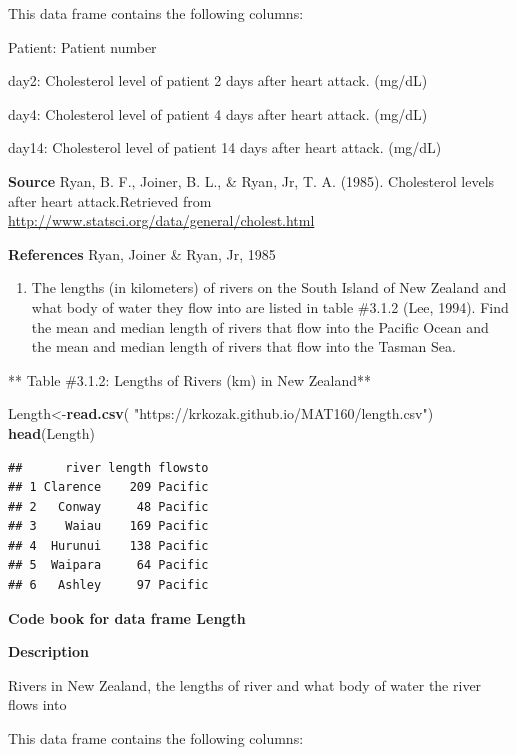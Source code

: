 \documentclass[
]{book}
\newenvironment{Shaded}{\begin{snugshade}}{\end{snugshade}}
\newcommand{\KeywordTok}[1]{\textcolor[rgb]{0.13,0.29,0.53}{\textbf{#1}}}
\newcommand{\NormalTok}[1]{#1}
\newcommand{\StringTok}[1]{\textcolor[rgb]{0.31,0.60,0.02}{#1}}
\providecommand{\tightlist}{%
  \setlength{\itemsep}{0pt}\setlength{\parskip}{0pt}}
\begin{document}
This data frame contains the following columns:

Patient: Patient number

day2: Cholesterol level of patient 2 days after heart attack. (mg/dL)

day4: Cholesterol level of patient 4 days after heart attack. (mg/dL)

day14: Cholesterol level of patient 14 days after heart attack. (mg/dL)

\textbf{Source}
Ryan, B. F., Joiner, B. L., \& Ryan, Jr, T. A. (1985). Cholesterol levels after heart attack.Retrieved from \url{http://www.statsci.org/data/general/cholest.html}

\textbf{References}
Ryan, Joiner \& Ryan, Jr, 1985

\begin{enumerate}
\def\labelenumi{\arabic{enumi}.}
\setcounter{enumi}{1}
\tightlist
\item
  The lengths (in kilometers) of rivers on the South Island of New Zealand and what body of water they flow into are listed in table \#3.1.2 (Lee, 1994). Find the mean and median length of rivers that flow into the Pacific Ocean and the mean and median length of rivers that flow into the Tasman Sea.
\end{enumerate}

** Table \#3.1.2: Lengths of Rivers (km) in New Zealand**

\begin{Shaded}
\begin{Highlighting}[]
\NormalTok{Length<-}\KeywordTok{read.csv}\NormalTok{(}
  \StringTok{"https://krkozak.github.io/MAT160/length.csv"}\NormalTok{)}
\KeywordTok{head}\NormalTok{(Length)}
\end{Highlighting}
\end{Shaded}

\begin{verbatim}
##      river length flowsto
## 1 Clarence    209 Pacific
## 2   Conway     48 Pacific
## 3    Waiau    169 Pacific
## 4  Hurunui    138 Pacific
## 5  Waipara     64 Pacific
## 6   Ashley     97 Pacific
\end{verbatim}

\textbf{Code book for data frame Length}

\textbf{Description}

Rivers in New Zealand, the lengths of river and what body of water the river flows into

This data frame contains the following columns:
\end{document}
